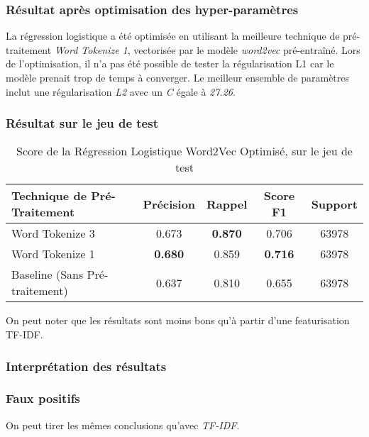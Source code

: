\subsubsection{Résultat après optimisation des hyper-paramètres}
La régression logistique a été optimisée en utilisant la meilleure technique de pré-traitement \textit{Word Tokenize 1}, vectorisée par le modèle \textit{word2vec} pré-entraîné. 
Lors de l'optimisation, il n'a pas été possible de tester la régularisation L1 car le modèle prenait trop de temps à converger.
Le meilleur ensemble de paramètres inclut une régularisation \textit{L2} avec un \textit{C} égale à \textit{27.26}.


\subsubsection{Résultat sur le jeu de test}
\begin{table}[ht]
    \centering
    \caption{Score de la Régression Logistique Word2Vec Optimisé, sur le jeu de test}
    \begin{tabular}{lcccc}
    \hline
    \textbf{Technique de Pré-Traitement} & \textbf{Précision} & \textbf{Rappel} & \textbf{Score F1} & \textbf{Support} \\ \hline
    Word Tokenize 3                          & 0.673              & \textbf{0.870}           & 0.706            & 63978            \\\hline
    Word Tokenize 1                          & \textbf{0.680}              & 0.859           & \textbf{0.716}             & 63978            \\\hline
    Baseline (Sans Pré-traitement)           & 0.637              & 0.810           & 0.655             & 63978            \\ \hline
\end{tabular}
\label{tab:results}
\end{table}

On peut noter que les résultats sont moins bons qu'à partir d'une featurisation TF-IDF.

\subsubsection{Interprétation des résultats}
\subsubsection{Faux positifs}
On peut tirer les mêmes conclusions qu'avec \textit{TF-IDF}.


